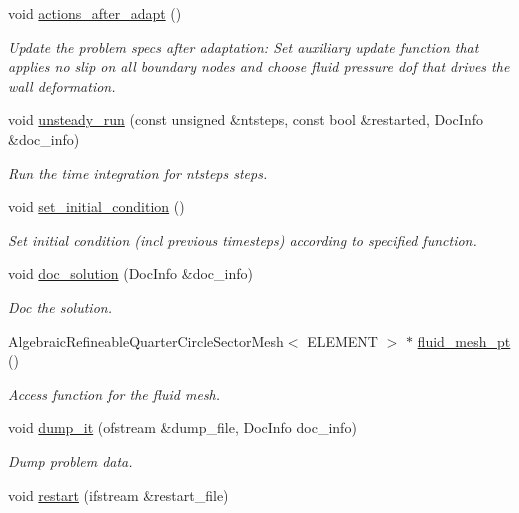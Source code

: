 \begin{DoxyCompactItemize}
void \hyperlink{classOscRingNStProblem_a2dd1cb9b211f2cbd2ea9aea625685bcb}{actions\+\_\+after\+\_\+adapt} ()
\begin{DoxyCompactList}\small\item\em Update the problem specs after adaptation\+: Set auxiliary update function that applies no slip on all boundary nodes and choose fluid pressure dof that drives the wall deformation. \end{DoxyCompactList}\item 
void \hyperlink{classOscRingNStProblem_a00e957fb6a313a9c1de784d0fa3a7a36}{unsteady\+\_\+run} (const unsigned \&ntsteps, const bool \&restarted, Doc\+Info \&doc\+\_\+info)
\begin{DoxyCompactList}\small\item\em Run the time integration for ntsteps steps. \end{DoxyCompactList}\item 
void \hyperlink{classOscRingNStProblem_ab1f2083699d00da4b7f6116e10792e86}{set\+\_\+initial\+\_\+condition} ()
\begin{DoxyCompactList}\small\item\em Set initial condition (incl previous timesteps) according to specified function. \end{DoxyCompactList}\item 
void \hyperlink{classOscRingNStProblem_a7de5df21c2179db1c97cc83332dcc82c}{doc\+\_\+solution} (Doc\+Info \&doc\+\_\+info)
\begin{DoxyCompactList}\small\item\em Doc the solution. \end{DoxyCompactList}\item 
Algebraic\+Refineable\+Quarter\+Circle\+Sector\+Mesh$<$ E\+L\+E\+M\+E\+NT $>$ $\ast$ \hyperlink{classOscRingNStProblem_ae9749337fca6dff52ac6e530c6339faa}{fluid\+\_\+mesh\+\_\+pt} ()
\begin{DoxyCompactList}\small\item\em Access function for the fluid mesh. \end{DoxyCompactList}\item 
void \hyperlink{classOscRingNStProblem_af32f94658174188b1f029446161755b2}{dump\+\_\+it} (ofstream \&dump\+\_\+file, Doc\+Info doc\+\_\+info)
\begin{DoxyCompactList}\small\item\em Dump problem data. \end{DoxyCompactList}\item 
void \hyperlink{classOscRingNStProblem_a0cf01737b8d53213d644413e84251d0f}{restart} (ifstream \&restart\+\_\+file)

\end{DoxyCompactItemize}
